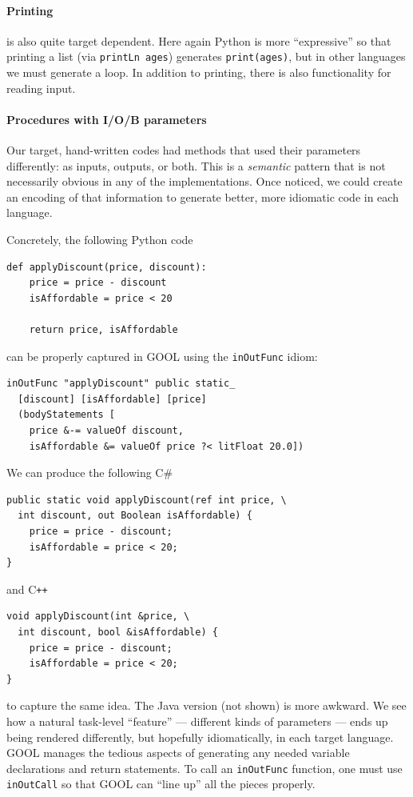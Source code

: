 \documentclass[sigplan,screen,10pt]{acmart}
\newcommand{\Csharp}{C\#}
\newcommand{\Cplusplus}{C\texttt{++}}
\begin{document}
\paragraph{Printing}
is also quite target dependent.  Here again Python
is more ``expressive'' so that printing a list (via
\verb|printLn ages|) generates \verb|print(ages)|, but in other languages
we must generate a loop. 
In addition to printing, there is also functionality for reading input.

\paragraph{Procedures with I/O/B parameters}
Our target, hand-written codes had methods that
used their parameters differently: as inputs, outputs, or both.
This is a \emph{semantic} pattern that is
not necessarily obvious in any of the implementations. Once noticed,
we could create an encoding of that information to generate better,
more idiomatic code in each language.

Concretely, the following Python code
\begin{lstlisting}
def applyDiscount(price, discount):
    price = price - discount
    isAffordable = price < 20

    return price, isAffordable
\end{lstlisting}
can be properly captured in GOOL using the \verb|inOutFunc| idiom:
\begin{lstlisting}
inOutFunc "applyDiscount" public static_
  [discount] [isAffordable] [price]
  (bodyStatements [
    price &-= valueOf discount,
    isAffordable &= valueOf price ?< litFloat 20.0])
\end{lstlisting}
We can produce the following \Csharp
\begin{lstlisting}
public static void applyDiscount(ref int price, \
  int discount, out Boolean isAffordable) {
    price = price - discount;
    isAffordable = price < 20;
}
\end{lstlisting}
and \Cplusplus
\begin{lstlisting}
void applyDiscount(int &price, \
  int discount, bool &isAffordable) {
    price = price - discount;
    isAffordable = price < 20;
}
\end{lstlisting}
to capture the same idea.  The Java version (not shown) is more
awkward.
We see how a natural task-level ``feature'' --- 
different kinds of parameters --- ends up being rendered differently,
but hopefully idiomatically, in each target language.  GOOL manages the
tedious aspects of generating any needed variable declarations and return
statements.  To call an \verb|inOutFunc| function, one must use
\verb|inOutCall| so that GOOL can ``line up'' all the pieces properly.
\end{document}
